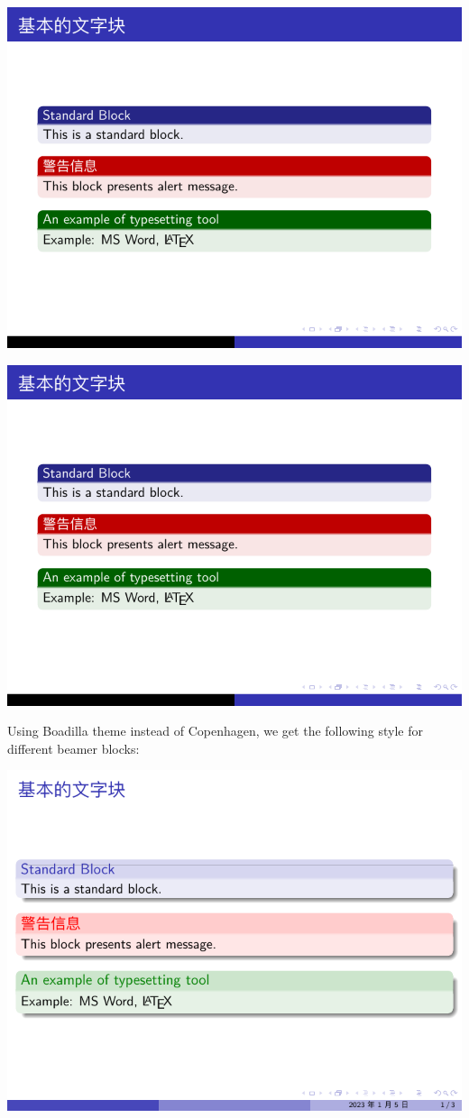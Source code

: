 \includegraphics[page=2]{examples/beamer/beamerblock03.pdf}

\includegraphics[page=3]{examples/beamer/beamerblock03.pdf}

Using {\ttfamily Boadilla} theme instead of {\ttfamily Copenhagen}, we get the following style for different beamer blocks:

\includegraphics[page=1]{examples/beamer/beamerblock04.pdf}

